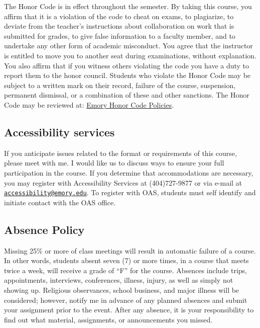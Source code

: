 \documentclass[11pt,]{article}
\begin{document}
The Honor Code is in effect throughout the semester. By taking this
course, you affirm that it is a violation of the code to cheat on exams,
to plagiarize, to deviate from the teacher's instructions about
collaboration on work that is submitted for grades, to give false
information to a faculty member, and to undertake any other form of
academic misconduct. You agree that the instructor is entitled to move
you to another seat during examinations, without explanation. You also
affirm that if you witness others violating the code you have a duty to
report them to the honor council. Students who violate the Honor Code
may be subject to a written mark on their record, failure of the course,
suspension, permanent dismissal, or a combination of these and other
sanctions. The Honor Code may be reviewed at:
\href{http://catalog.college.emory.edu/academic/policies-regulations/honor-code.html}{Emory
Honor Code Policies}.

\hypertarget{accessibility-services}{%
\subsection{Accessibility services}\label{accessibility-services}}

If you anticipate issues related to the format or requirements of this
course, please meet with me. I would like us to discuss ways to ensure
your full participation in the course. If you determine that
accommodations are necessary, you may register with Accessibility
Services at (404)727-9877 or via e-mail at
\href{mailto:accessibility@emory.edu}{\nolinkurl{accessibility@emory.edu}}.
To register with OAS, students must self identify and initiate contact
with the OAS office.

\hypertarget{absence-policy}{%
\subsection{Absence Policy}\label{absence-policy}}

Missing 25\% or more of class meetings will result in automatic failure
of a course. In other words, students absent seven (7) or more times, in
a course that meets twice a week, will receive a grade of ``F'' for the
course. Absences include trips, appointments, interviews, conferences,
illness, injury, as well as simply not showing up. Religious
observances, school business, and major illness will be considered;
however, notify me in advance of any planned absences and submit your
assignment prior to the event. After any absence, it is your
responsibility to find out what material, assignments, or announcements
you missed.
\end{document}
